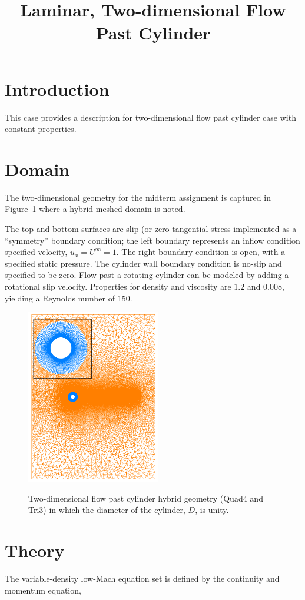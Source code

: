 \documentclass{article}
\title{Laminar, Two-dimensional Flow Past Cylinder}
\date{}
\begin{document}
\maketitle

\section{Introduction}
This case provides a description for two-dimensional flow past cylinder case
with constant properties.

\section{Domain}
The two-dimensional geometry for the midterm assignment is captured in 
Figure~\ref{fig:geom} where a hybrid meshed domain is noted.

The top and bottom surfaces are slip (or zero tangential stress implemented as a ``symmetry'' boundary 
condition; the left boundary represents an inflow condition specified velocity, $u_x =  U^\infty = 1$. 
The right boundary condition is open, with a specified static pressure. The cylinder wall boundary condition is 
no-slip and specified to be zero. Flow past a rotating cylinder can be modeled by adding a rotational slip 
velocity. Properties for density and viscosity are $1.2$ and $0.008$, yielding a Reynolds number of 150.

\begin{figure}[!htbp]
  \centering
  {
   \includegraphics[height=3.0in]{images/street_geom.png}
  }
  \caption{Two-dimensional flow past cylinder hybrid geometry (Quad4 and Tri3) in which the diameter of the cylinder, $D$, is unity.}
  \label{fig:geom}
\end{figure}

\section{Theory}
The variable-density low-Mach equation set is defined by the continuity and momentum equation,
\end{document}

